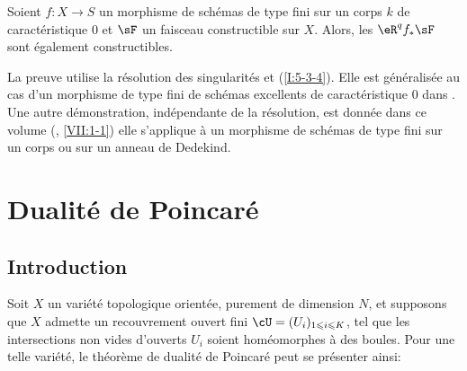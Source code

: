 \begin{theorem}\label{I:5-3-7} %
Soient $f:X\to S$ un morphisme de schémas de type fini sur un corps $k$ de 
caractéristique $0$ et $\sF$ un faisceau constructible sur $X$. Alors, les 
$\eR^q f_* \sF$ sont également constructibles.
\end{theorem}

La preuve utilise la résolution des singularités et (\ref{I:5-3-4}). Elle est 
généralisée au cas d'un morphisme de type fini de schémas excellents de 
caractéristique $0$ dans \cite[XIX.5]{sga4}. Une autre démonstration, 
indépendante de la résolution, est donnée dans ce volume 
(, \ref{VII:1-1}) 
elle s'applique à un morphisme de schémas de type fini sur un corps ou sur 
un anneau de Dedekind. 




















\section{Dualité de Poincaré}










\subsection{Introduction}\label{I:6-1}

Soit $X$ un variété topologique orientée, purement de dimension $N$, et 
supposons que $X$ admette un recouvrement ouvert fini 
$\cU=(U_i)_{1\leqslant i\leqslant K}$, tel que les intersections non vides 
d'ouverts $U_i$ soient homéomorphes à des boules. Pour une telle variété, 
le théorème de dualité de Poincaré peut se présenter ainsi: 


